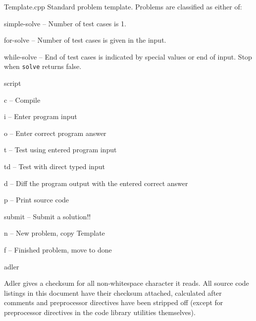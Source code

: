 \categorycontents{}

\begin{algorithm}{Template.cpp}
\usage{}
Standard problem template. Problems are classified as either of:
  \begin{description}
  \item{simple-solve} -- Number of test cases is 1.
  \item{for-solve} -- Number of test cases is given in the input.
  \item{while-solve} -- End of test cases is indicated by special values
    or end of input. Stop when {\tt solve} returns false.
  \end{description}
\end{algorithm}

\begin{algorithm}{script}
  \begin{description}
  \item{c} -- Compile
  \item{i} -- Enter program input
  \item{o} -- Enter correct program answer
  \item{t} -- Test using entered program input
  \item{td} -- Test with direct typed input
  \item{d} -- Diff the program output with the entered correct answer
  \item{p} -- Print source code
  \item{submit} -- Submit a solution!!
  \item{n} -- New problem, copy Template
  \item{f} -- Finished problem, move to done
  \end{description}
\end{algorithm}


\begin{algorithm}{adler}

Adler gives a checksum for all non-whitespace character it reads.
All source code listings in this document have their checksum attached,
calculated after comments and preprocessor directives have been stripped off
(except for preprocessor directives in the code library utilities themselves).
\end{algorithm}

